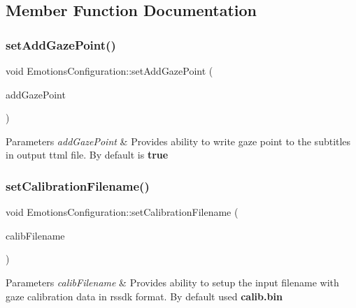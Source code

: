 \subsection{Member Function Documentation}
\mbox{\label{class_emotions_configuration_a712005bb21d3745664a9ff1c23466fc3}} 
\subsubsection{\texorpdfstring{set\+Add\+Gaze\+Point()}{setAddGazePoint()}}
{\footnotesize\ttfamily void Emotions\+Configuration\+::set\+Add\+Gaze\+Point (\begin{DoxyParamCaption}\item[{pxc\+Bool}]{add\+Gaze\+Point }\end{DoxyParamCaption})}


\begin{DoxyParams}{Parameters}
{\em add\+Gaze\+Point} & Provides ability to write gaze point to the subtitles in output ttml file. By default is {\bfseries true}\\
\hline
\end{DoxyParams}
\mbox{\label{class_emotions_configuration_a4645e007a7b2a9d9c52f020530b401fb}} 
\subsubsection{\texorpdfstring{set\+Calibration\+Filename()}{setCalibrationFilename()}}
{\footnotesize\ttfamily void Emotions\+Configuration\+::set\+Calibration\+Filename (\begin{DoxyParamCaption}\item[{pxc\+C\+H\+AR $\ast$}]{calib\+Filename }\end{DoxyParamCaption})}


\begin{DoxyParams}{Parameters}
{\em calib\+Filename} & Provides ability to setup the input filename with gaze calibration data in rssdk format. By default used {\bfseries calib.\+bin}\\
\hline
\end{DoxyParams}
\mbox{\label{class_emotions_configuration_a7b8cdc24a83960cef6579cc4ce454709}} 
